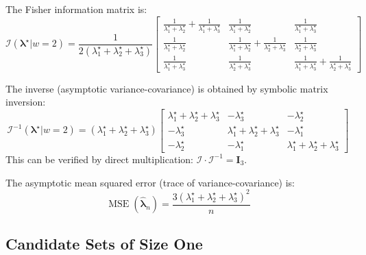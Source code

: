 \documentclass[pdflatex,sn-mathphys-num,Numbered]{sn-jnl}
\newcommand{\tparam}[1]{{#1}^{\star}}  %
\newcommand{\expomle}{\boldsymbol{\hat{\lambda}}_n}
\newcommand{\infomatrx}{\mathcal{I}}
\newcommand{\matrx}[1]{\mathbf{#1}}
\renewcommand{\vec}[1]{\boldsymbol{#1}}
\DeclareMathOperator{\MSE}{\mathrm{MSE}}
\theoremstyle{thmstyleone}
\theoremstyle{thmstylethree}
\theoremstyle{thmstyletwo}
\begin{document}
The Fisher information matrix is:
\begingroup\small
\begin{equation}
\infomatrx(\tparam{\vec{\lambda}} | w{=}2) = \frac{1}{2(\tparam{\lambda}_1 + \tparam{\lambda}_2 + \tparam{\lambda}_3)}
\begin{bmatrix}
\frac{1}{\tparam{\lambda}_1+\tparam{\lambda}_2}+\frac{1}{\tparam{\lambda}_1+\tparam{\lambda}_3} & \frac{1}{\tparam{\lambda}_1+\tparam{\lambda}_2} & \frac{1}{\tparam{\lambda}_1+\tparam{\lambda}_3}\\[4pt]
\frac{1}{\tparam{\lambda}_1+\tparam{\lambda}_2} & \frac{1}{\tparam{\lambda}_1+\tparam{\lambda}_2}+\frac{1}{\tparam{\lambda}_2+\tparam{\lambda}_3} & \frac{1}{\tparam{\lambda}_2+\tparam{\lambda}_3}\\[4pt]
\frac{1}{\tparam{\lambda}_1+\tparam{\lambda}_3} & \frac{1}{\tparam{\lambda}_2+\tparam{\lambda}_3} & \frac{1}{\tparam{\lambda}_1+\tparam{\lambda}_3}+\frac{1}{\tparam{\lambda}_2+\tparam{\lambda}_3}
\end{bmatrix}
\end{equation}
\endgroup

The inverse (asymptotic variance-covariance) is obtained by symbolic matrix inversion:
\begin{equation}
\label{eq:expo_vcov_3comp_w2}
\infomatrx^{-1}(\tparam{\vec{\lambda}} | w=2) = (\tparam{\lambda}_1+\tparam{\lambda}_2+\tparam{\lambda}_3)
\begin{bmatrix}
\tparam{\lambda}_1+\tparam{\lambda}_2+\tparam{\lambda}_3 & -\tparam{\lambda}_3 & -\tparam{\lambda}_2\\
-\tparam{\lambda}_3 & \tparam{\lambda}_1+\tparam{\lambda}_2+\tparam{\lambda}_3 & -\tparam{\lambda}_1\\
-\tparam{\lambda}_2 & -\tparam{\lambda}_1 & \tparam{\lambda}_1+\tparam{\lambda}_2+\tparam{\lambda}_3
\end{bmatrix}
\end{equation}
This can be verified by direct multiplication: $\infomatrx \cdot \infomatrx^{-1} = \matrx{I}_3$.

The asymptotic mean squared error (trace of variance-covariance) is:
\begin{equation}
\MSE(\expomle) = \frac{3(\tparam{\lambda}_1 + \tparam{\lambda}_2 + \tparam{\lambda}_3)^2}{n}
\end{equation}

\subsection{Candidate Sets of Size One}
\end{document}
